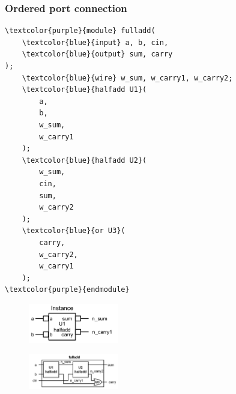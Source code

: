 \documentclass[t]{beamer}
\begin{document}
\begin{frame}[fragile]
\frametitle{Ordered port connection}
\begin{multicols}{2}
{\scriptsize%
\begin{Verbatim}[commandchars=\\\{\}, tabsize=2]
\textcolor{purple}{module} fulladd(
    \textcolor{blue}{input} a, b, cin,
    \textcolor{blue}{output} sum, carry
);
    \textcolor{blue}{wire} w_sum, w_carry1, w_carry2;
    \textcolor{blue}{halfadd U1}(
        a,
        b,
        w_sum,
        w_carry1
    );
    \textcolor{blue}{halfadd U2}(
        w_sum,
        cin,
        sum,
        w_carry2
    );
    \textcolor{blue}{or U3}(
        carry, 
        w_carry2,
        w_carry1
    );
\textcolor{purple}{endmodule}
\end{Verbatim}
}
\columnbreak
\begin{figure}[H!]
	\includegraphics[width=0.35\textwidth]{img/03_inst.png}
\end{figure}
\begin{figure}[H!]
    \includegraphics[width=0.35\textwidth]{img/03_fulladd.png}
\end{figure}
\end{multicols}
\end{frame}
\end{document}
